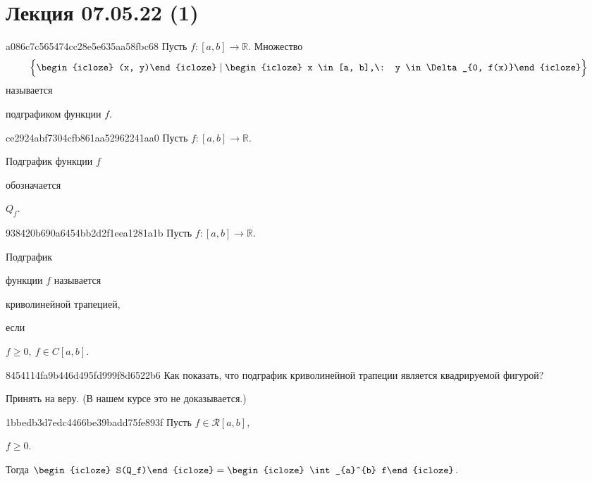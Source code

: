 \section{Лекция 07.05.22 (1)}
\begin{note}{a086c7c565474cc28e5e635aa58fbc68}
    Пусть \({ f : [a, b] \to \mathbb R }\).
    Множество
    \[
        \Big\{ \begin{icloze}{2}(x, y)\end{icloze} \mid \begin{icloze}{1}x \in [a, b],\: y \in \Delta_{0, f(x)}\end{icloze} \Big\}
    \]
    называется \begin{icloze}{3}подграфиком функции \({ f }\).\end{icloze}
\end{note}

\begin{note}{ce2924abf7304cfb861aa52962241aa0}
    Пусть \({ f : [a, b] \to \mathbb R }\).
    \begin{icloze}{1}Подграфик функции \({ f }\)\end{icloze} обозначается \begin{icloze}{2}\({ Q_{f} }\).\end{icloze}
\end{note}

\begin{note}{938420b690a6454bb2d2f1eea1281a1b}
    Пусть \({ f : [a, b] \to \mathbb R }\).
    \begin{icloze}{3}Подграфик\end{icloze} функции \({ f }\) называется \begin{icloze}{2}криволинейной трапецией,\end{icloze} если \begin{icloze}{1}\({ f \geqslant 0,\: f \in C[a, b] }\).\end{icloze}
\end{note}

\begin{note}{8454114fa9b446d495fd999f8d6522b6}
    Как показать, что подграфик криволинейной трапеции является квадрируемой фигурой?

    \begin{cloze}{1}
        Принять на веру. (В нашем курсе это не доказывается.)
    \end{cloze}
\end{note}

\begin{note}{1bbedb3d7edc4466be39badd75fe893f}
    Пусть \({ f \in \mathcal R[a, b] }\),\: \begin{icloze}{3}\({ f \geqslant 0 }\).\end{icloze}
    Тогда \({ \begin{icloze}{2}S(Q_f)\end{icloze} = \begin{icloze}{1}\int_{a}^{b} f\end{icloze} }\).
\end{note}

